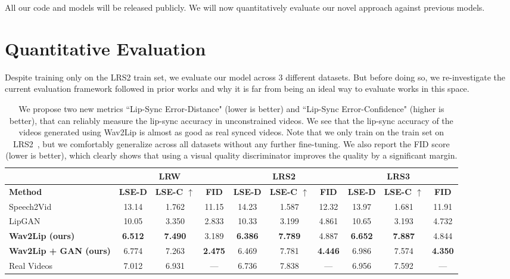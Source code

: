 \documentclass[sigconf]{acmart}
\begin{document}
All our code and models will be released publicly. We will now quantitatively evaluate our novel approach against previous models.

\section{Quantitative Evaluation}
\label{section:quanteval}
Despite training only on the LRS2 train set, we evaluate our model across $3$ different datasets. But before doing so, we re-investigate the current evaluation framework followed in prior works and why it is far from being an ideal way to evaluate works in this space.

\begin{table}[ht]
  \setlength{\tabcolsep}{4pt}
    \centering
    
    \begin{tabular}{|l||c|c|c||c|c|c||c|c|c|}
    \hline
    & \multicolumn{3}{c||}{LRW~\cite{chung2016lip}} & \multicolumn{3}{c||}{LRS2~\cite{Afouras18c}} & \multicolumn{3}{c|}{LRS3~\cite{afouras2018lrs3}}
     \\
    \hline
    \textbf{Method} & \textbf{LSE-D	} & \textbf{LSE-C $\uparrow$} & \textbf{FID } & \textbf{LSE-D } & \textbf{LSE-C $\uparrow$} & \textbf{FID } & \textbf{LSE-D } & \textbf{LSE-C $\uparrow$} & \textbf{FID	} \\
    \hline
    Speech2Vid~\cite{jamaludin2019you} & 13.14 & 1.762 & 11.15 & 14.23 & 1.587 & 12.32 & 13.97 & 1.681 & 11.91\\
    LipGAN~\cite{kr2019towards} & 10.05 & 3.350 & 2.833 & 10.33 & 3.199 & 4.861 & 10.65 & 3.193 & 4.732 \\
    \textbf{Wav2Lip (ours)} & \textbf{6.512} & \textbf{7.490} & 3.189 & \textbf{6.386} & \textbf{7.789} & 4.887 & \textbf{6.652} & \textbf{7.887} & 4.844 \\
    \textbf{Wav2Lip + GAN (ours)} & 6.774 & 7.263 & \textbf{2.475} & 6.469 & 7.781 & \textbf{4.446} & 6.986 & 7.574 & \textbf{4.350} \\
    \hline
    Real Videos & 7.012  & 6.931  & --- & 6.736 & 7.838 & --- & 6.956 & 7.592 & --- \\
    \hline
    
    \end{tabular}
    \caption{We propose two new metrics ``Lip-Sync Error-Distance" (lower is better) and ``Lip-Sync Error-Confidence" (higher is better), that can reliably measure the lip-sync accuracy in unconstrained videos. We see that the lip-sync accuracy of the videos generated using Wav2Lip is almost as good as real synced videos. Note that we only train on the train set on LRS2~\cite{Afouras18c}, but we comfortably generalize across all datasets without any further fine-tuning. We also report the FID score (lower is better), which clearly shows that using a visual quality discriminator improves the quality by a significant margin.}
    \vspace{-0.7cm}
    \label{tab:lse_scores}
\end{table}
\end{document}
